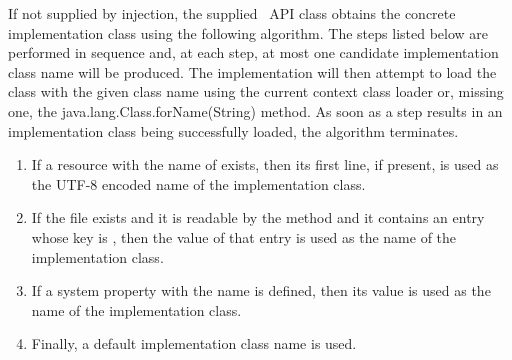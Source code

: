 If not supplied by injection, the supplied \rd\ API class obtains the concrete implementation class using the following algorithm. The steps listed below 
are performed in sequence and, at each step, at most one candidate implementation class name will be produced. The implementation will then attempt to load the class with the given class name using the current context class loader or, missing one, the java.lang.Class.forName(String) method. As soon as a step results in an implementation class being successfully loaded, the algorithm terminates.
\begin{enumerate}
\item If a resource with the name of  exists, then its first line, if present, is used as the UTF-8 encoded name of the implementation class. 
\item If the  file exists and it is readable by the  method and it contains an entry whose key is , then the value of that entry is used as the name of the implementation class. 
\item If a system property with the name  is defined, then its value is used as the name of the implementation class. 
\item Finally, a default implementation class name is used. 
\end{enumerate}
